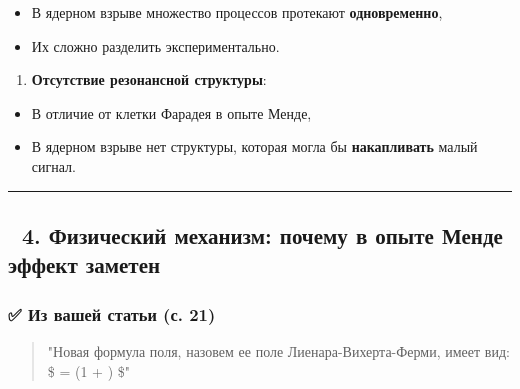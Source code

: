 \documentclass[11pt]{article}
\providecommand{\tightlist}{%
      \setlength{\itemsep}{0pt}\setlength{\parskip}{0pt}}
\begin{document}
\begin{itemize}
\tightlist
\item
  В ядерном взрыве множество процессов протекают
  \textbf{одновременно},\\
\item
  Их сложно разделить экспериментально.
\end{itemize}

\begin{enumerate}
\def\labelenumi{\arabic{enumi}.}
\setcounter{enumi}{3}
\tightlist
\item
  \textbf{Отсутствие резонансной структуры}:\\
\end{enumerate}

\begin{itemize}
\tightlist
\item
  В отличие от клетки Фарадея в опыте Менде,\\
\item
  В ядерном взрыве нет структуры, которая могла бы \textbf{накапливать}
  малый сигнал.
\end{itemize}

\begin{center}\rule{0.5\linewidth}{\linethickness}\end{center}

\subsection{🔹 4. Физический механизм: почему в опыте Менде эффект
заметен}\label{ux444ux438ux437ux438ux447ux435ux441ux43aux438ux439-ux43cux435ux445ux430ux43dux438ux437ux43c-ux43fux43eux447ux435ux43cux443-ux432-ux43eux43fux44bux442ux435-ux43cux435ux43dux434ux435-ux44dux444ux444ux435ux43aux442-ux437ux430ux43cux435ux442ux435ux43d}

\subsubsection{✅ Из вашей статьи (с.
21)}\label{ux438ux437-ux432ux430ux448ux435ux439-ux441ux442ux430ux442ux44cux438-ux441.-21}

\begin{quote}
"Новая формула поля, назовем ее поле Лиенара-Вихерта-Ферми, имеет вид:\\
\$  = 
 \left(1
+ \right) \$"
\end{quote}
\end{document}
